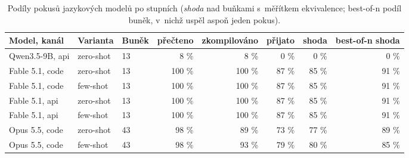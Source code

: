 \documentclass{article}
\begin{document}
\begin{table}[ht]
\centering\small
\setlength{\tabcolsep}{4pt}
\begin{tabular}{l l l r r r r r}
\toprule
\textbf{Model, kanál} & \textbf{Varianta} & \textbf{Buněk} & \textbf{přečteno} & \textbf{zkompilováno} & \textbf{přijato} & \textbf{shoda} & \textbf{best-of-n shoda} \\
\midrule
Qwen3.5-9B, api & zero-shot & 13 & 8 \% & 8 \% & 0 \% & 0 \% & 0 \% \\
Fable 5.1, code & zero-shot & 13 & 100 \% & 100 \% & 87 \% & 85 \% & 91 \% \\
Fable 5.1, code & few-shot & 13 & 100 \% & 100 \% & 87 \% & 85 \% & 91 \% \\
Fable 5.1, api & zero-shot & 13 & 100 \% & 100 \% & 87 \% & 85 \% & 91 \% \\
Fable 5.1, api & few-shot & 13 & 100 \% & 100 \% & 87 \% & 85 \% & 91 \% \\
Opus 5.5, code & zero-shot & 43 & 98 \% & 89 \% & 73 \% & 77 \% & 89 \% \\
Opus 5.5, code & few-shot & 43 & 98 \% & 93 \% & 79 \% & 80 \% & 85 \% \\
\bottomrule
\end{tabular}
\caption{Podíly pokusů jazykových modelů po stupních (\emph{shoda} nad buňkami s~měřítkem ekvivalence; best-of-n podíl buněk, v~nichž uspěl aspoň jeden pokus).}
\label{tab:llm-vysledky}
\end{table}
\end{document}
